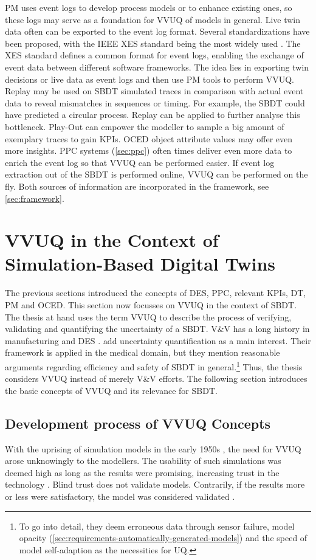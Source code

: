 PM uses event logs to develop process models or to enhance existing ones, so these logs may serve as a foundation for VVUQ of models in general. Live twin data often can be exported to the event log format. Several standardizations have been proposed, with the IEEE XES standard being the most widely used \autocite{van2016data}. The XES standard defines a common format for event logs, enabling the exchange of event data between different software frameworks. The idea lies in exporting twin decisions or live data as event logs and then use PM tools to perform VVUQ.
Replay may be used on SBDT simulated traces in comparison with actual event data to reveal mismatches in sequences or timing. For example, the SBDT could have predicted a circular process. Replay can be applied to further analyse this bottleneck. Play-Out can empower the modeller to sample a big amount of exemplary traces to gain KPIs. OCED object attribute values may offer even more insights.
PPC systems (\autoref{sec:ppc}) often times deliver even more data to enrich the event log so that VVUQ can be performed easier. If event log extraction out of the SBDT is performed online, VVUQ can be performed on the fly. Both sources of information are incorporated in the framework, see \autoref{sec:framework}.

\section{VVUQ in the Context of Simulation-Based Digital Twins}
\label{sec:vvuq-sbdt}

The previous sections introduced the concepts of DES, PPC, relevant KPIs, DT, PM and OCED. This section now focusses on VVUQ in the context of SBDT. The thesis at hand uses the term VVUQ to describe the process of verifying, validating and quantifying the uncertainty of a SBDT. V&V has a long history in manufacturing and DES \autocite{Bitencourt2023}. \Autocite{sel2025survey} add uncertainty quantification as a main interest. Their framework is applied in the medical domain, but they mention reasonable arguments regarding efficiency and safety of SBDT in general.\footnote{To go into detail, they deem erroneous data through sensor failure, model opacity (\autoref{sec:requirements-automatically-generated-models}) and the speed of model self-adaption as the necessities for UQ.} Thus, the thesis considers VVUQ instead of merely V&V efforts. The following section introduces the basic concepts of VVUQ and its relevance for SBDT.


\subsection{Development process of VVUQ Concepts}
\label{sec:historical-development}
With the uprising of simulation models in the early 1950s \autocite{evans1967simulation}, the need for VVUQ arose unknowingly to the modellers. The usability of such simulations was deemed high as long as the results were promising, increasing trust in the technology \autocite{durst2017historical}. Blind trust does not validate models. Contrarily, if the results more or less were satisfactory, the model was considered validated \autocite{bonani2003physics}.

